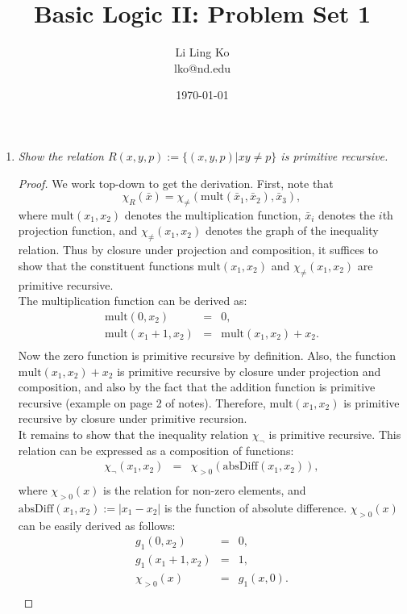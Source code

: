 \documentclass{article}
\begin{document}
\title{Basic Logic II: Problem Set 1}
\author{Li Ling Ko\\ lko@nd.edu}
\date{\today}
\maketitle

\begin{enumerate}[label={\bf Q\arabic*:}]
  \item \it Show the relation $R(x,y,p):=\{(x,y,p)|xy\neq p\}$ is primitive
    recursive.

    \begin{proof}
      We work top-down to get the derivation. First, note that
      \[\chi_R(\bar{x})=\chi_{\neq}(\text{mult}(\bar{x}_1,
        \bar{x}_2), \bar{x}_3),\]
      where $\text{mult}(x_1,x_2)$ denotes the multiplication function,
      $\bar{x}_i$ denotes the $i$th projection function, and
      $\chi_{\neq}(x_1,x_2)$ denotes the graph of the inequality relation.
      Thus by closure under projection and composition, it suffices to show
      that the constituent functions $\text{mult}(x_1,x_2)$ and
      $\chi_{\neq}(x_1,x_2)$ are primitive recursive. \\

      The multiplication function can be derived as:
      \[\begin{array}{lcl}
        \text{mult}(0,x_2) &= &0, \\
        \text{mult}(x_1+1,x_2) &= &\text{mult}(x_1,x_2)+x_2. \\
      \end{array}\]
      Now the zero
      function is primitive recursive by definition. Also, the function
      $\text{mult}(x_1,x_2)+x_2$ is primitive recursive by closure under
      projection and composition, and also by the fact that the addition
      function is primitive recursive (example on page 2 of notes).
      Therefore, $\text{mult}(x_1,x_2)$ is primitive recursive by closure
      under primitive recursion. \\

      It remains to show that the inequality relation $\chi_{\neg}$ is
      primitive recursive. This relation can be expressed as a composition
      of functions:
      \[\begin{array}{lcl}
        \chi_{\neg}(x_1,x_2) &= &\chi_{>0}(\text{absDiff}(x_1,x_2)), \\
      \end{array}\]
      where $\chi_{>0}(x)$ is the relation for non-zero elements, and
      $\text{absDiff}(x_1,x_2):=|x_1-x_2|$ is the function of absolute
      difference. $\chi_{>0}(x)$ can be easily derived as follows:
      \[\begin{array}{lcl}
        g_1(0,x_2) &= &0, \\
        g_1(x_1+1,x_2) &= &1, \\
        \chi_{>0}(x) &= &g_1(x,0). \\
      \end{array}\]


\end{proof}
\end{enumerate}
\end{document}
